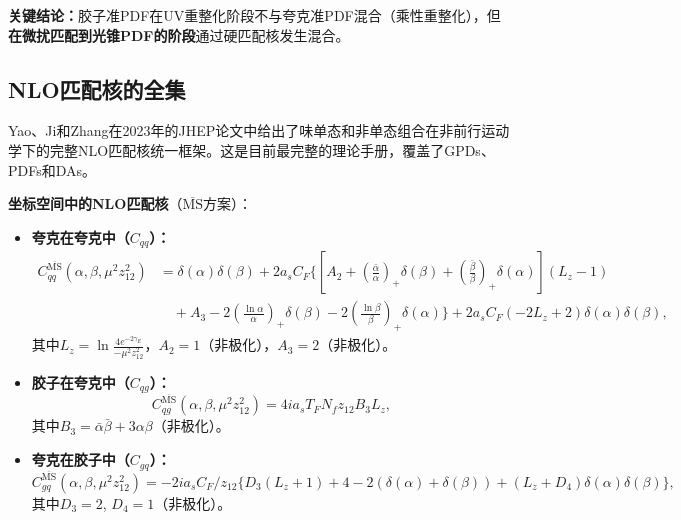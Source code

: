 \documentclass[12pt,a4paper]{ctexart}
\theoremstyle{definition}
\begin{document}
\textbf{关键结论：}胶子准PDF在UV重整化阶段不与夸克准PDF混合（乘性重整化），但\textbf{在微扰匹配到光锥PDF的阶段}通过硬匹配核发生混合\cite{Zhang2019}。

\subsection{NLO匹配核的全集}

Yao、Ji和Zhang\cite{Yao2023}在2023年的JHEP论文中给出了味单态和非单态组合在非前行运动学下的完整NLO匹配核统一框架。这是目前最完整的理论手册，覆盖了GPDs、PDFs和DAs。

\textbf{坐标空间中的NLO匹配核}（$\overline{\text{MS}}$方案）\cite{Yao2023}：

\begin{itemize}
    \item \textbf{夸克在夸克中（$C_{qq}$）：}
    \begin{equation}
    \begin{aligned}
    C^{\overline{\text{MS}}}_{qq}(\alpha, \beta, \mu^2 z^2_{12}) &= \delta(\alpha)\delta(\beta) + 2a_s C_F \Bigg\{ \left[A_2 + \left(\frac{\bar{\alpha}}{\alpha}\right)_+ \delta(\beta) + \left(\frac{\bar{\beta}}{\beta}\right)_+ \delta(\alpha)\right](L_z - 1) \\
    &\quad + A_3 - 2\left(\frac{\ln\alpha}{\alpha}\right)_+ \delta(\beta) - 2\left(\frac{\ln\beta}{\beta}\right)_+ \delta(\alpha) \Bigg\} + 2a_s C_F (-2L_z + 2)\delta(\alpha)\delta(\beta),
    \end{aligned}
    \end{equation}
    其中$L_z = \ln\frac{4e^{-2\gamma_E}}{-\mu^2 z^2_{12}}$，$A_2 = 1$（非极化），$A_3 = 2$（非极化）。

    \item \textbf{胶子在夸克中（$C_{qg}$）：}
    \begin{equation}
    C^{\overline{\text{MS}}}_{qg}(\alpha, \beta, \mu^2 z^2_{12}) = 4i a_s T_F N_f z_{12} B_3 L_z,
    \end{equation}
    其中$B_3 = \bar{\alpha}\bar{\beta} + 3\alpha\beta$（非极化）。

    \item \textbf{夸克在胶子中（$C_{gq}$）：}
    \begin{equation}
    C^{\overline{\text{MS}}}_{gq}(\alpha, \beta, \mu^2 z^2_{12}) = -2i a_s C_F / z_{12} \Big\{ D_3(L_z + 1) + 4 - 2(\delta(\alpha) + \delta(\beta)) + (L_z + D_4)\delta(\alpha)\delta(\beta) \Big\},
    \end{equation}
    其中$D_3 = 2$, $D_4 = 1$（非极化）。


\end{itemize}
\end{document}
